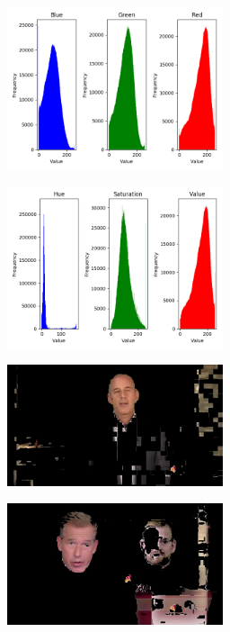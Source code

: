 \documentclass{article}
\begin{document}
\vspace*{20pt}
\begin{minipage}{0.5\linewidth}
 \label{fig: rgb}
\centering
\includegraphics[width=2.5in]{../output/f_train_rgb_distributions.png}
\end{minipage}%
\begin{minipage}{0.5\linewidth}
 \label{fig: hsv}
\centering
\includegraphics[width=2.5in]{../output/f_train_hsv_distributions.png}
\end{minipage}

\begin{minipage}{0.5\linewidth}
 \label{fig: hsv_good}
\centering
\includegraphics[width=2.5in]{../output/clip_1_hsv/160.jpg}
\end{minipage}
\begin{minipage}{0.5\linewidth}
 \label{fig: hsv_bad}
\centering
\includegraphics[width=2.5in]{../output/clip_1_hsv/050.jpg}
\end{minipage}
\vspace*{10pt}
\end{document}

